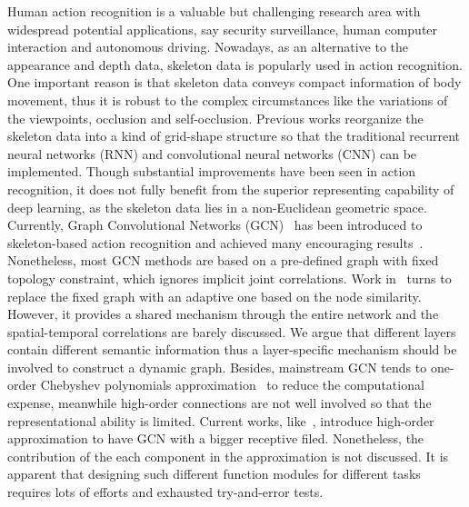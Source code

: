 \documentclass[letterpaper]{article} \usepackage{aaai19}  \usepackage{times}  \usepackage{helvet} \usepackage{courier}  \usepackage[hyphens]{url}  \usepackage{graphicx} \urlstyle{rm} \def\UrlFont{\rm}  \usepackage{graphicx}  \frenchspacing  \setlength{\pdfpagewidth}{8.5in}  \setlength{\pdfpageheight}{11in}
\begin{document}
Human action recognition is a valuable but challenging research area with widespread potential applications, say security surveillance, human computer interaction and autonomous driving. Nowadays, as an alternative to the appearance and depth data, skeleton data is popularly used in action recognition. One important reason is that skeleton data conveys compact information of body movement, thus it is robust to the complex circumstances like the variations of the viewpoints, occlusion and self-occlusion. Previous works reorganize the skeleton data into a kind of grid-shape structure so that the traditional recurrent neural networks (RNN) and convolutional neural networks (CNN) can be implemented. Though substantial improvements have been seen in action recognition, it does not fully benefit from the superior representing capability of deep learning, as the skeleton data lies in a non-Euclidean geometric space. Currently, Graph Convolutional Networks (GCN)~\cite{kipf2016semi,defferrard2016convolutional} has been introduced to skeleton-based action recognition and achieved many encouraging results~\cite{li2018spatio,yan2018stgan,li2019spatio,gao2019optimized,shi2019two,li2019actional}. Nonetheless, most GCN methods are based on a pre-defined graph with fixed topology constraint, which ignores implicit joint correlations. Work in~\cite{shi2019two} turns to replace the fixed graph with an adaptive one based on the node similarity. However, it provides a shared mechanism through the entire network and the spatial-temporal correlations are barely discussed. We argue that different layers contain different semantic information thus a layer-specific mechanism should be involved to construct a dynamic graph. Besides, mainstream GCN tends to one-order Chebyshev polynomials approximation~\cite{kipf2016semi} to reduce the computational expense, meanwhile high-order connections are not well involved so that the representational ability is limited. Current works, like~\cite{gao2019optimized}, introduce high-order approximation to have GCN with a bigger receptive filed. Nonetheless, the contribution of the each component in the approximation is not discussed. {It is apparent that designing such different function modules for different tasks requires lots of efforts and exhausted try-and-error tests.}\par
\end{document}
